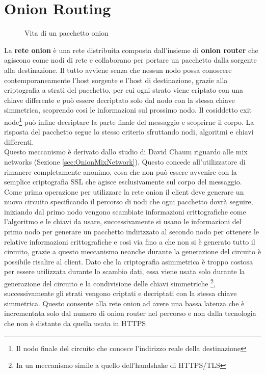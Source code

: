 \chapter{Onion Routing}
\label{chap:Capitolo1}

\begin{figure}[htpb!]
    \centering
    
    \caption{Vita di un pacchetto onion}
    \label{fig:routing}
\end{figure}

La \textbf{rete onion} è una rete distribuita composta dall'insieme di \textbf{onion router} che agiscono come nodi di rete e collaborano per portare un pacchetto dalla sorgente alla destinazione. 
Il tutto avviene senza che nessun nodo possa conoscere contemporaneamente l'host sorgente e l'host di destinazione, grazie alla criptografia a strati del pacchetto, per cui ogni strato viene criptato con una chiave differente e può essere decriptato solo dal nodo con la stessa chiave simmetrica, scoprendo cosi le informazioni sul prossimo nodo. 
Il cosiddetto exit node\footnote{Il nodo finale del circuito che conosce l'indirizzo reale della destinazione} può infine decriptare la parte finale del messaggio e scoprirne il corpo. 
La risposta del pacchetto segue lo stesso criterio sfruttando nodi, algoritmi e chiavi differenti. \\
Questo meccanismo è derivato dallo studio di David Chaum riguardo alle mix networks (Sezione \ref{sec:OnionMixNetwork}).
Questo concede all'utilizzatore di rimanere completamente anonimo, cosa che non può essere avvenire con la semplice criptografia SSL che agisce esclusivamente sul corpo del messaggio. \\
Come prima operazione per utilizzare la rete onion il client deve generare un nuovo circuito specificando il percorso di nodi che ogni pacchetto dovrà seguire, iniziando dal primo nodo vengono scambiate informazioni crittografiche come l'algoritmo e le chiavi da usare, successivamente si usano le informazioni del primo nodo per generare un pacchetto indirizzato al secondo nodo per ottenere le relative informazioni crittografiche e cosi via fino a che non si è generato tutto il circuito, grazie a questo meccanismo neanche durante la generazione del circuito è possibile risalire al client. 
Dato che la criptografia asimmetrica è troppo costosa per essere utilizzata durante lo scambio dati, essa viene usata solo durante la generazione del circuito e la condivisione delle chiavi simmetriche \footnote{In un meccanismo simile a quello dell'handshake di HTTPS/TLS}, successivamente gli strati vengono criptati e decriptati con la stessa chiave simmetrica. 
Questo consente alla rete onion ad avere una bassa latenza che è incrementata solo dal numero di onion router nel percorso e non dalla tecnologia che non è distante da quella usata in HTTPS 
\cite{OnionRouting}

